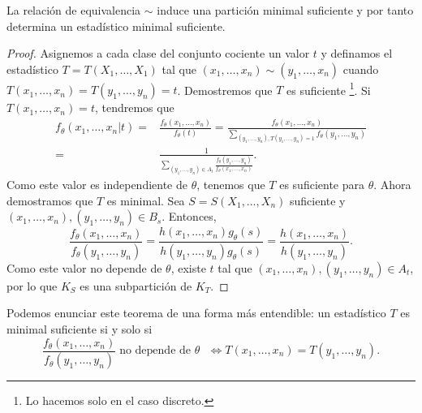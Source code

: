 \begin{theorem}
La relación de equivalencia $\displaystyle \sim $ induce una partición minimal suficiente y por tanto determina un estadístico minimal suficiente.
\end{theorem}
\begin{proof}
Asignemos a cada clase del conjunto cociente un valor $\displaystyle t $ y definamos el estadístico $\displaystyle T = T\left(X_{1}, \ldots, X_{1}\right) $ tal que $\displaystyle \left(x_{1}, \ldots, x_{n}\right)\sim \left(y_{1}, \ldots, x_{n}\right) $ cuando $\displaystyle T\left(x_{1}, \ldots, x_{n}\right)=T\left(y_{1}, \ldots, y_{n}\right)=t $. Demostremos que $\displaystyle T $ es suficiente \footnote{Lo hacemos solo en el caso discreto.}. 
Si $\displaystyle T\left(x_{1}, \ldots, x_{n}\right)=t $, tendremos que
\[
\begin{split}
	f_{\theta}\left(x_{1}, \ldots, x_{n} | t\right) = & \frac{f_{\theta}\left(x_{1}, \ldots, x_{n}\right)}{f_{\theta}\left(t\right)}=\frac{f_{\theta}\left(x_{1}, \ldots, x_{n}\right)}{\sum^{}_{\left(y_{1}, \ldots, y_{n}\right), T\left(y_{1}, \ldots, y_{n}\right)=1}f_{\theta}\left(y_{1}, \ldots, y_{n}\right)} \\
	= & \frac{1}{\sum^{}_{\left(y_{1}, \ldots, y_{n}\right)\in A_{t}}\frac{f_{\theta}\left(y_{1}, \ldots, y_{n}\right)}{f_{\theta}\left(x_{1}, \ldots, x_{n}\right)}} .
\end{split}
\]
Como este valor es independiente de $\displaystyle \theta $, tenemos que $\displaystyle T $ es suficiente para $\displaystyle \theta $. 
Ahora demostramos que $\displaystyle T $ es minimal. Sea $\displaystyle S = S\left(X_{1}, \ldots, X_{n}\right) $ suficiente y $\displaystyle \left(x_{1}, \ldots, x_{n}\right), \left(y_{1}, \ldots, y_{n}\right)\in B_{s} $. Entonces,
\[\frac{f_{\theta}\left(x_{1}, \ldots, x_{n}\right)}{f_{\theta}\left(y_{1}, \ldots, y_{n}\right)}=\frac{h\left(x_{1}, \ldots, x_{n}\right)g_{\theta}\left(s\right)}{h\left(y_{1}, \ldots, y_{n}\right)g_{\theta}\left(s\right)} = \frac{h\left(x_{1}, \ldots, x_{n}\right)}{h\left(y_{1}, \ldots, y_{n}\right)}.\]
Como este valor no depende de $\displaystyle \theta $, existe $\displaystyle t $ tal que $\displaystyle \left(x_{1}, \ldots, x_{n}\right), \left(y_{1}, \ldots, y_{n}\right) \in A_{t} $, por lo que $\displaystyle K_{S} $ es una subpartición de $\displaystyle K_{T} $. 
\end{proof}
\begin{observation}
Podemos enunciar este teorema de una forma más entendible: un estadístico $\displaystyle T $ es minimal suficiente si y solo si  
\[ \frac{f_{\theta}\left(x_{1}, \ldots, x_{n}\right)}{f_{\theta}\left(y_{1}, \ldots, y_{n}\right)}\; \text{no depende de $\displaystyle \theta $ } \iff T\left(x_{1}, \ldots, x_{n}\right)=T\left(y_{1}, \ldots, y_{n}\right).\]
\end{observation}

